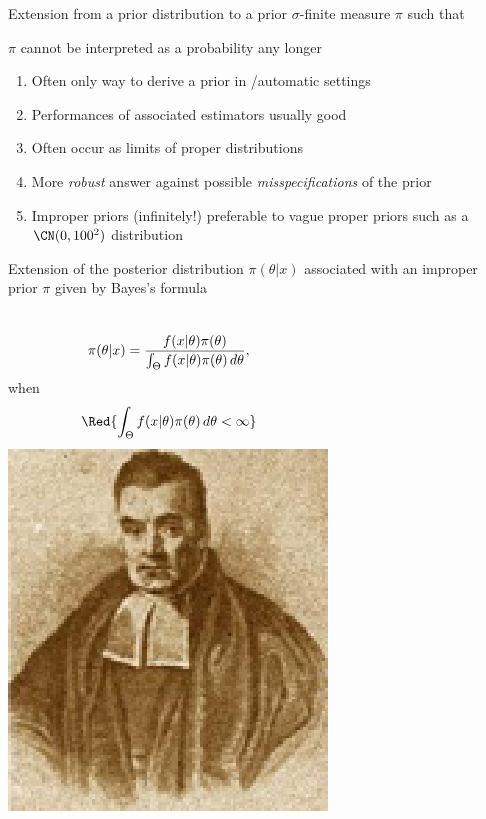 \begin{slide}

Extension from a prior distribution to a prior $\sigma$-finite measure $\pi$ such that
{}

\pause\bigskip
{} $\pi$ cannot be interpreted as a probability
any longer

\end{slide}\begin{slide}

\begin{enumerate}
\item Often only way to derive a prior in \noni/automatic settings

\pause
\item Performances of associated estimators usually good

\pause
\item Often occur as limits of proper distributions 

\pause
\item More {\it robust} answer against possible {\it misspecifications}
of the prior 

\pause
\item Improper priors (infinitely!) preferable to vague proper priors 
such as a $\CN(0,100^2)$ distribution  \MidnightBlue{[e.g., {\sf BUGS}]}
\end{enumerate}

\end{slide}\begin{slide}
Extension of the posterior distribution $\pi(\theta|x)$
associated with an improper prior $\pi$ given by Bayes's formula
\smallskip
\begin{columns}
$$
\pi(\theta|x) = {f(x|\theta) \pi(\theta) \over
	   \int_{\Theta} f(x|\theta) \pi(\theta) \,d\theta},
$$
when 
$$
{\Red{\int_{\Theta} f(x|\theta) \pi(\theta) \,d\theta < \infty}}
$$
\includegraphics[height=3truecm]{figures/TBayes}
\end{columns}


\end{slide}
